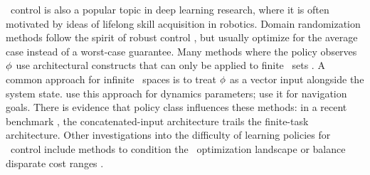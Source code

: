 \Multienv\ control is also a popular topic in deep learning research,
where it is often motivated by ideas of lifelong skill acquisition in robotics.
Domain randomization methods
follow the spirit of robust control
\citep{peng-dynamics-randomization-corr17},
but usually optimize for the average case instead of a worst-case guarantee.
Many methods where the policy observes $\phi$
use architectural constructs that can only be applied to finite \envword\ sets
\citep{yang-multitask,parisotto-actormimic,devin-modular}.
A common approach for infinite \envword\ spaces is to treat $\phi$ as a vector input alongside the system state.
\citet{yu-up-osi-rss17,chen-hardware-conditioned}
use this approach for dynamics parameters;
\citet{schaul-uvfa} use it for navigation goals.
There is evidence that policy class influences these methods:
in a recent benchmark %
\citep{yu-metaworld},
the concatenated-input architecture
trails the finite-task architecture.
Other investigations into the difficulty of learning policies for \multienv\ control include
methods to condition the \multienv\ optimization landscape
\citep{yu-pcgrad}
or balance disparate cost ranges
\citep{hasselt-popart}.


